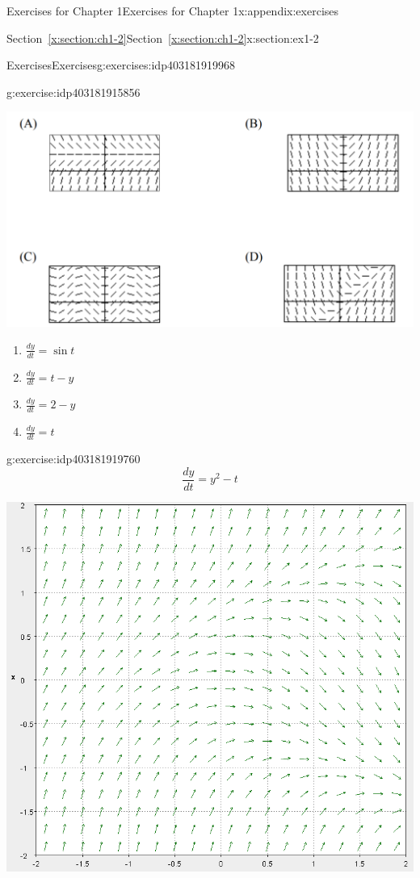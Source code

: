 \documentclass[oneside,10pt,]{book}
\newcommand{\xreffont}{\relax}
\numberwithin{equation}{section}
\numberwithin{equation}{section}
\begin{document}
\begin{appendixptx}{Exercises for Chapter 1}{}{Exercises for Chapter 1}{}{}{x:appendix:exercises}
\begin{sectionptx}{Section~{\xreffont\ref*{x:section:ch1-2}}}{}{Section~{\xreffont\ref*{x:section:ch1-2}}}{}{}{x:section:ex1-2}
\begin{exercises-subsection-numberless}{Exercises}{}{Exercises}{}{}{g:exercises:idp403181919968}
\begin{divisionexercise}{1}{}{}{g:exercise:idp403181915856}
\begin{image}{0}{1}{0}
\includegraphics[width=\linewidth]{images/1.2-1.png}
\end{image}%
%
\begin{enumerate}[label=(\alph*)]
\item{}\(\displaystyle \frac{dy}{dt}=\sin t\)%
\item{}\(\displaystyle \frac{dy}{dt}=t-y\)%
\item{}\(\displaystyle \frac{dy}{dt}=2-y\)%
\item{}\(\displaystyle \frac{dy}{dt}=t\)%
\end{enumerate}
\end{divisionexercise}%
\begin{divisionexercise}{2}{}{}{g:exercise:idp403181919760}%
%
\begin{equation*}
\frac{dy}{dt}=y^{2}-t
\end{equation*}
\begin{image}{0}{1}{0}%
\includegraphics[width=\linewidth]{images/1.2-2.png}

\end{image}
\end{divisionexercise}
\end{exercises-subsection-numberless}
\end{sectionptx}
\end{appendixptx}
\end{document}
